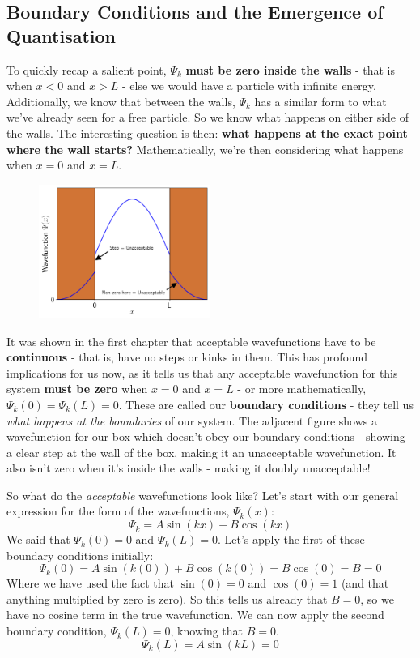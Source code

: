 \documentclass{memoir}[11pt,oneside,a4paper,openany]
\newcommand{\wf}{\ensuremath{\Psi}\xspace}
\begin{document}
\subsection{Boundary Conditions and the Emergence of Quantisation}
To quickly recap a salient point, $\wf_k$ \textbf{must be zero inside the walls} - that is when $x<0$ and $x>L$ - else we would have a particle with infinite energy. Additionally, we know that between the walls, $\wf_k$ has a similar form to what we've already seen for a free particle. So we know what happens on either side of the walls. The interesting question is then: \textbf{what happens at the exact point where the wall starts?} Mathematically, we're then considering what happens when $x=0$ and $x=L$. 

\begin{figure}
	\includegraphics[width=0.5\textwidth]{particle_box_wf_unacceptable.png}
\end{figure}
It was shown in the first chapter that acceptable wavefunctions have to be \textbf{continuous} - that is, have no steps or kinks in them. This has profound implications for us now, as it tells us that any acceptable wavefunction for this system \textbf{must be zero} when $x=0$ and $x=L$ - or more mathematically, $\wf_k(0) = \wf_k(L) = 0$. These are called our \textbf{boundary conditions} - they tell us \emph{what happens at the boundaries} of our system. The adjacent figure shows a wavefunction for our box which doesn't obey our boundary conditions - showing a clear step at the wall of the box, making it an unacceptable wavefunction. It also isn't zero when it's inside the walls - making it doubly unacceptable!

So what do the \emph{acceptable} wavefunctions look like? Let's start with our general expression for the form of the wavefunctions, $\wf_k(x)$:
\begin{equation}
	\wf_k = A\sin(kx) + B\cos(kx)
\end{equation}
We said that $\wf_k(0) = 0$ and $\wf_k(L) = 0$. Let's apply the first of these boundary conditions initially:
\begin{equation}
	\wf_k(0) = A\sin(k(0)) + B\cos(k(0)) = B\cos(0) = B = 0
\end{equation}
Where we have used the fact that $\sin(0) = 0$ and $\cos(0) = 1$ (and that anything multiplied by zero is zero). So this tells us already that $B=0$, so we have no cosine term in the true wavefunction. We can now apply the second boundary condition, $\wf_k(L) = 0$, knowing that $B=0$.
\begin{equation}
	\wf_k(L) = A\sin(kL) = 0
\end{equation}
\end{document}
